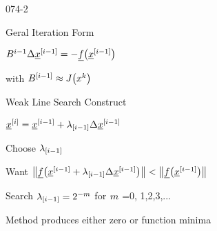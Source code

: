 \begin{mitframe}{074-2}
\begin{listone}
	\item Geral Iteration Form
    	\begin{listtwo}
        	\item $\exergy^{\state-1}\iipf\uline{\disp}^{[\state-1]}=-\uline{\fug}\big(\uline{\disp}^{[\state-1]}\big)$
            \begin{listthree}
            	\item with $\exergy^{[\state-1]}\approx{J}\big(\disp^{\thermcond}\big)$
            \end{listthree}
        \end{listtwo}
    \item Weak Line Search Construct
    	\begin{listtwo}
        	\item $\uline{\disp}^{[\state]}=\uline{\disp}^{[\state-1]}+\lambda_{[\state-1]}\iipf\uline{\disp}^{[\state-1]}$
            \item Choose $\lambda_{[\state-1]}$
        		\begin{listthree}
                	\item Want $\big\|\uline{\fug}\big(\uline{\disp}^{[\state-1]}+\lambda_{[\state-1]}\iipf\uline{\disp}^{[\state-1]}\big)\big\|<\big\|\uline{\fug}\big(\uline{\disp}^{[\state-1]}\big)\big\|$
                    \item Search $\lambda_{[\state-1]}=2^{-\mass}$ for $\mass$ =0, 1,2,3,...
                \end{listthree}
        	\item Method produces either zero or function minima
        \end{listtwo}
\end{listone}    
\end{mitframe}